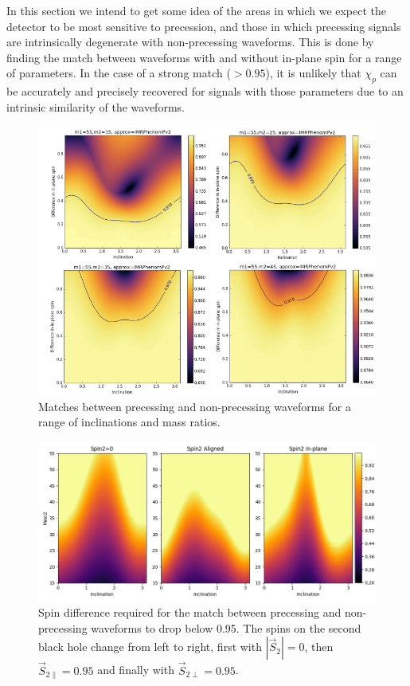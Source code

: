 \documentclass[11pt]{article}
\begin{document}
In this section we intend to get some idea of the areas in which we expect the detector to be most sensitive to precession, and those in which precessing signals are intrinsically degenerate with non-precessing waveforms. This is done by finding the match between waveforms with and without in-plane spin for a range of parameters. In the case of a strong match ($>0.95$), it is unlikely that $\chi_p$ can be accurately and precisely recovered for signals with those parameters due to an intrinsic similarity of the waveforms.

\begin{figure}
	\includegraphics[width=1\textwidth]{fig10.png}
	\centering
	\caption{Matches between precessing and non-precessing waveforms for a range of inclinations and mass ratios.}
	\centering
\end{figure}
\begin{figure}
	\includegraphics[width=1\textwidth]{fig11.png}
	\centering
	\caption{Spin difference required for the match between precessing and non-precessing waveforms to drop below 0.95. The spins on the second black hole change from left to right, first with $|\vec{S}_2|=0$, then $\vec{S}_{2\parallel}=0.95$ and finally with $\vec{S}_{2\perp}=0.95$.}
	\centering
\end{figure}
\end{document}
